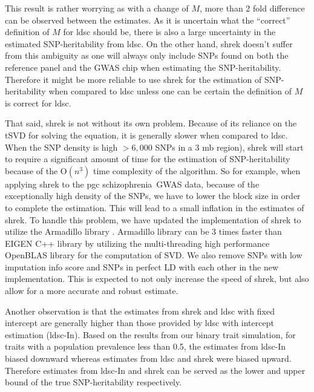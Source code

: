 \documentclass[12pt]{scrbook}
\newcommand*{\scz}{schizophrenia}
\begin{document}
This result is rather worrying as with a change of $M$, more than 2 fold difference can be observed between the estimates.
As it is uncertain what the ``correct'' definition of $M$ for \gls{ldsc} should be, there is also a large uncertainty in the estimated \gls{SNP}-heritability from \gls{ldsc}.
On the other hand, \gls{shrek} doesn't suffer from this ambiguity as one will always only include \glspl{SNP} found on both the reference panel and the \gls{GWAS} chip when estimating the \gls{SNP}-heritability.
Therefore it might be more reliable to use \gls{shrek} for the estimation of \gls{SNP}-heritability when compared to \gls{ldsc} unless one can be certain the definition of $M$ is correct for \gls{ldsc}.

That said, \gls{shrek} is not without its own problem.
Because of its reliance on the \gls{tSVD} for solving the equation, it is generally slower when compared to \gls{ldsc}.
When the \gls{SNP} density is high $>6,000$ \glspl{SNP} in a 3 \gls{mb} region), \gls{shrek} will start to require a significant amount of time for the estimation of \gls{SNP}-heritability because of the $\mathrm{O}(n^3)$ time complexity of the algorithm.
So for example, when applying \gls{shrek} to the \gls{pgc} \scz\ \gls{GWAS} data, because of the exceptionally high density of the \glspl{SNP}, we have to lower the block size in order to complete the estimation. 
This will lead to a small inflation in the estimates of \gls{shrek}. 
To handle this problem, we have updated the implementation of \gls{shrek} to utilize the Armadillo library \citep{Sanderson2010}.
Armadillo library can be 3 times faster than EIGEN C++ library by utilizing the multi-threading high performance OpenBLAS library for the computation of \gls{SVD}.
We also remove \glspl{SNP} with low imputation info score and \glspl{SNP} in perfect \gls{LD} with each other in the new implementation.
This is expected to not only increase the speed of \gls{shrek}, but also allow for a more accurate and robust estimate.

Another observation is that the estimates from \gls{shrek} and \gls{ldsc} with fixed intercept are generally higher than those provided by \gls{ldsc} with intercept estimation (\gls{ldsc}-In). 
Based on the results from our binary trait simulation, for traits with a population prevalence less than 0.5, the estimates from \gls{ldsc}-In biased downward whereas estimates from \gls{ldsc} and \gls{shrek} were biased upward.
Therefore estimates from \gls{ldsc}-In and \gls{shrek} can be served as the lower and upper bound of the true \gls{SNP}-heritability respectively. 
\end{document}
